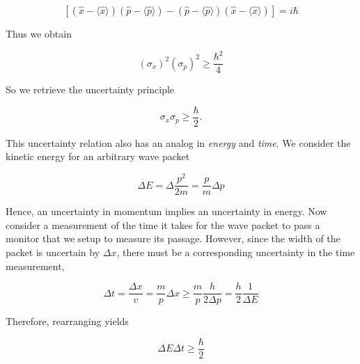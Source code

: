 \[
[(\hat{x} - \langle \hat{x} \rangle )(\hat{p} - \langle \hat{p} \rangle
) - (\hat{p} - \langle \hat{p} \rangle )(\hat{x} - \langle \hat{x} \rangle )]
= i\hbar
\] \vspace{3px}

Thus we obtain

\[
  (\sigma_x)^2 (\sigma_p)^2 \geq \frac{\hbar^2}{4}
\] \vspace{3px}

So we retrieve the uncertainty principle

\[
\sigma_x\sigma_p \geq \frac{\hbar}{2}.
\] \vspace{3px}

This uncertainty relation also has an analog in \textit{energy} and
\textit{time}. We consider the kinetic energy for an arbitrary wave packet

\[
\Delta E = \Delta \frac{p^2}{2m} = \frac{p}{m} \Delta p
\] \vspace{3px}

Hence, an uncertainty in momentum implies an uncertainty in energy. Now
consider a measurement of the time it takes for the wave packet to pass
a monitor that we setup to measure its passage. However, since the width of the
packet is uncertain by $\Delta x$, there must be a corresponding uncertainty in
the time measurement, 

\[
\Delta t = \frac{\Delta x}{v} = \frac{m}{p}\Delta x \geq
\frac{m}{p}\frac{h}{2\Delta p} = \frac{h}{2}\frac{1}{\Delta E}
\] \vspace{3px}

Therefore, rearranging yields

\[
\Delta E \Delta t \geq \frac{\hbar}{2} 
\] \vspace{3px}


